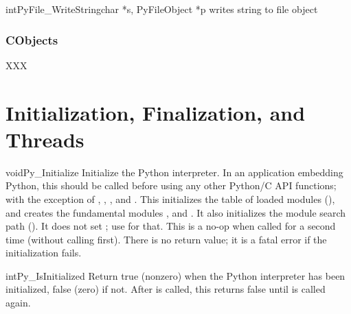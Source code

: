 \documentclass[twoside,openright]{report}
\begin{document}
\begin{cfuncdesc}{int}{PyFile_WriteString}{char *s, PyFileObject *p}
writes string  to file object 
\end{cfuncdesc}


\subsection{CObjects}

XXX


\chapter{Initialization, Finalization, and Threads}

\begin{cfuncdesc}{void}{Py_Initialize}{}
Initialize the Python interpreter.  In an application embedding 
Python, this should be called before using any other Python/C API 
functions; with the exception of , 
, , and 
.  This initializes the table of loaded 
modules (), and creates the fundamental modules 
,  and .  It also 
initializes the module search path ().  It does not set 
; use  for that.  This is a no-op
when called for a second time (without calling 
first).  There is no return value; it is a fatal error if the
initialization fails.
\end{cfuncdesc}

\begin{cfuncdesc}{int}{Py_IsInitialized}{}
Return true (nonzero) when the Python interpreter has been
initialized, false (zero) if not.  After  is
called, this returns false until  is called
again.
\end{cfuncdesc}
\end{document}
